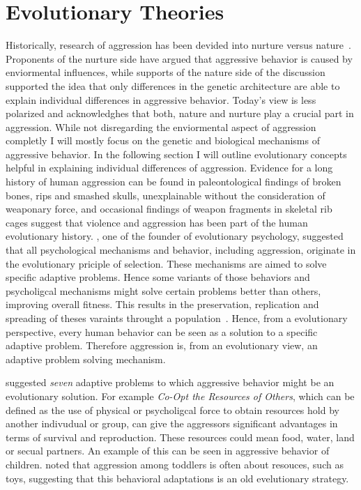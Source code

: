 \section{Evolutionary Theories}
\label{sec:evolutionary_theories}

Historically, research of aggression has been devided into nurture versus nature~\cite{Archer2009}. 
Proponents of the nurture side have argued that aggressive behavior is caused by enviormental influences, while supports of the nature side of the discussion supported the idea that only differences in the genetic architecture are able to explain individual differences in aggressive behavior.
Today's view is less polarized and acknowledghes that both, nature and nurture play a crucial part in aggression.
While not disregarding the enviormental aspect of aggression completly I will mostly focus on the genetic and biological mechanisms of aggressive behavior.
In the following section I will outline evolutionary concepts helpful in explaining individual differences of aggression. 
\vfill
Evidence for a long history of human aggression can be found in  paleontological findings of broken bones, rips and smashed skulls, unexplainable without the consideration of weaponary force, and occasional findings of weapon fragments in skeletal rib cages suggest that violence and aggression has been part of the human evolutionary history. 
\citet{Buss1997}, one of the founder of evolutionary psychology, suggested that all psychological mechanisms and behavior, including aggression, originate in the evolutionary priciple of selection.  
These mechanisms are aimed to solve specific adaptive problems.
Hence some variants of those behaviors and psycholigcal mechanisms might solve certain problems better than others, improving overall fitness.
This results in the preservation, replication and spreading of theses varaints throught a population~\cite{Buss1997}.
Hence, from a evolutionary perspective, every human behavior can be seen as a solution to a specific adaptive problem.
Therefore aggression is, from an evolutionary view, an adaptive problem solving mechanism.

\citet{Buss1997} suggested \textit{seven} adaptive problems to which aggressive behavior might be an evolutionary solution.
For example \textit{Co-Opt the Resources of Others}, which can be defined as the use of physical or psycholigcal force to obtain resources hold by another indivudual or group, can give the aggressors significant advantages in terms of survival and reproduction.
These resources could mean food, water, land or secual partners.
An example of this can be seen in aggressive behavior of children.
\citet{Campbell1995} noted that aggression among toddlers is often about resouces, such as toys, suggesting that this behavioral adaptations is an old evelutionary strategy.

